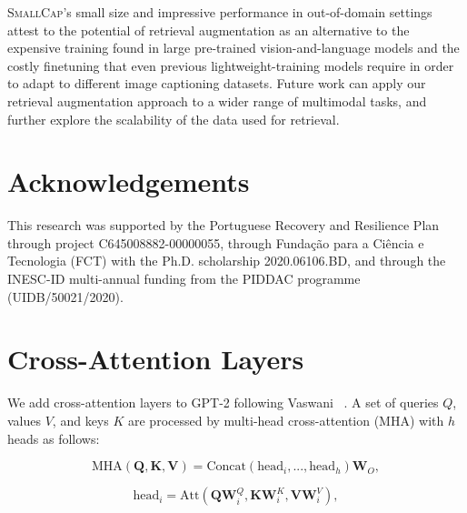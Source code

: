 \documentclass[10pt,twocolumn,letterpaper]{article}
\newcommand{\model}{\textsc{SmallCap}\xspace}
\begin{document}
\model's small size and impressive performance in out-of-domain settings attest to the potential of retrieval augmentation as an alternative to the expensive training found in large pre-trained vision-and-language models and the costly finetuning that even previous lightweight-training models require in order to adapt to different image captioning datasets. Future work can apply our retrieval augmentation approach to a wider range of multimodal tasks, and further explore the scalability of the data used for retrieval. 





\section*{Acknowledgements}
This research was supported by the Portuguese Recovery and Resilience Plan through project C645008882-00000055, through Funda\c{c}\~ao para a Ci\^encia e Tecnologia (FCT) with the Ph.D. scholarship 2020.06106.BD, and through the INESC-ID multi-annual funding from the PIDDAC programme (UIDB/50021/2020). 


{\small


}

\appendix

\newpage



\section{Cross-Attention Layers}
\label{app:cross-attention}
We add cross-attention layers to GPT-2 following Vaswani \etal~\cite{NIPS2017_3f5ee243}. A set of queries $Q$, values $V$, and keys $K$ are processed by multi-head cross-attention (MHA) with $h$ heads as follows:

\begin{equation}
    \text{MHA}(\textbf{Q}, \textbf{K}, \textbf{V} ) =
    \text{Concat}(\text{head}_i, ..., \text{head}_h)\textbf{W}_O,
\end{equation}

\begin{equation}
\text{head}_i=\text{Att}(\textbf{QW}_i^Q,\textbf{KW}_i^K,\textbf{VW}_i^V),
\end{equation}
\end{document}
